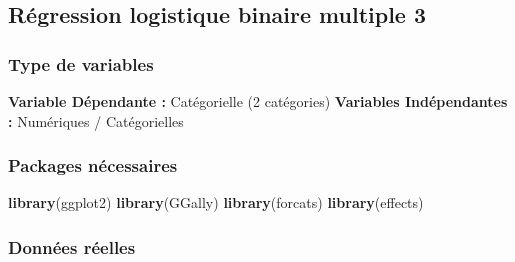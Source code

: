 \documentclass[
]{book}
\newenvironment{Shaded}{\begin{snugshade}}{\end{snugshade}}
\newcommand{\KeywordTok}[1]{\textcolor[rgb]{0.13,0.29,0.53}{\textbf{#1}}}
\newcommand{\NormalTok}[1]{#1}
\begin{document}
\hypertarget{ruxe9gression-logistique-binaire-multiple-3}{%
\subsection{Régression logistique binaire multiple 3}\label{ruxe9gression-logistique-binaire-multiple-3}}

\hypertarget{type-de-variables-11}{%
\subsubsection{Type de variables}\label{type-de-variables-11}}

\textbf{Variable Dépendante :} Catégorielle (2 catégories)
\textbf{Variables Indépendantes :} Numériques / Catégorielles

\hypertarget{packages-nuxe9cessaires-11}{%
\subsubsection{Packages nécessaires}\label{packages-nuxe9cessaires-11}}

\begin{Shaded}
\begin{Highlighting}[]
\KeywordTok{library}\NormalTok{(ggplot2)}
\KeywordTok{library}\NormalTok{(GGally)}
\KeywordTok{library}\NormalTok{(forcats)}
\KeywordTok{library}\NormalTok{(effects)}
\end{Highlighting}
\end{Shaded}

\hypertarget{donnuxe9es-ruxe9elles-11}{%
\subsubsection{Données réelles}\label{donnuxe9es-ruxe9elles-11}}
\end{document}
